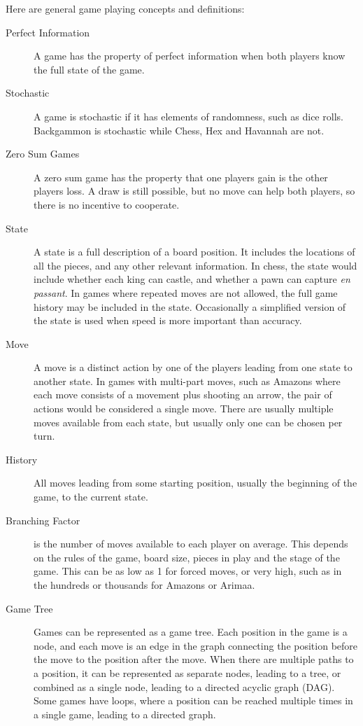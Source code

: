 
Here are general game playing concepts and definitions:

\begin{description}
\item[Perfect Information] A game has the property of perfect information when both players know the full state of the game.
\item[Stochastic] A game is stochastic if it has elements of randomness, such as dice rolls. Backgammon is stochastic while Chess, Hex and Havannah are not.
\item[Zero Sum Games] A zero sum game has the property that one players gain is the other players loss. A draw is still possible, but no move can help both players, so there is no incentive to cooperate.
\item[State] A state is a full description of a board position. It includes the locations of all the pieces, and any other relevant information. In chess, the state would include whether each king can castle, and whether a pawn can capture \textit{en passant}. In games where repeated moves are not allowed, the full game history may be included in the state. Occasionally a simplified version of the state is used when speed is more important than accuracy.
\item[Move] A move is a distinct action by one of the players leading from one state to another state. In games with multi-part moves, such as Amazons where each move consists of a movement plus shooting an arrow, the pair of actions would be considered a single move. There are usually multiple moves available from each state, but usually only one can be chosen per turn.
\item[History] All moves leading from some starting position, usually the beginning of the game, to the current state.
\item[Branching Factor] is the number of moves available to each player on average. This depends on the rules of the game, board size, pieces in play and the stage of the game. This can be as low as 1 for forced moves, or very high, such as in the hundreds or thousands for Amazons or Arimaa.
\item[Game Tree] Games can be represented as a game tree. Each position in the game is a node, and each move is an edge in the graph connecting the position before the move to the position after the move. When there are multiple paths to a position, it can be represented as separate nodes, leading to a tree, or combined as a single node, leading to a directed acyclic graph (DAG). Some games have loops, where a position can be reached multiple times in a single game, leading to a directed graph.

\end{description}
